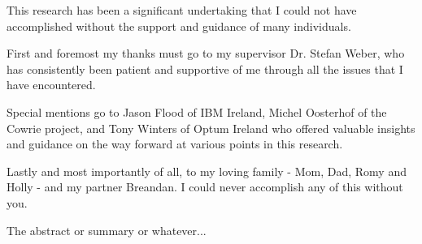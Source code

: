 \documentclass[a4paper, 12pt, oneside]{report}
\begin{document}

\thesistitlepage                            %

\thesisdeclarationpage				  		%

\thesispermissionpage				  		%


\begin{thesisacknowledgments}               %
This research has been a significant undertaking that I could not have accomplished without the support and guidance of many individuals. 

First and foremost my thanks must go to my supervisor Dr. Stefan Weber, who has consistently been patient and supportive of me through all the issues that I have encountered.

Special mentions go to Jason Flood of IBM Ireland, Michel Oosterhof of the Cowrie project, and Tony Winters of Optum Ireland who offered valuable insights and guidance on the way forward at various points in this research.

Lastly and most importantly of all, to my loving family - Mom, Dad, Romy and Holly - and my partner Breandan. I could never accomplish any of this without you.

\end{thesisacknowledgments}                 %

\begin{thesisabstract}

The abstract or summary or whatever...

\end{thesisabstract}

\tableofcontents                            %
\listoftables                               %
\listoffigures                              %

                                
                                






\begin{appendix}

\end{appendix}





\end{document}
